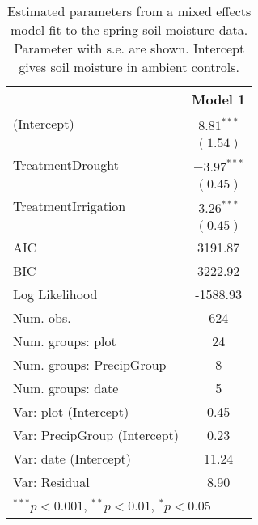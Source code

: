 
\begin{table}
\caption{Estimated parameters from a mixed effects model fit to the spring soil moisture data. Parameter with s.e. are shown. Intercept gives soil moisture in ambient controls.}
\begin{center}
\begin{tabular}{l c }
\hline
 & Model 1 \\
\hline
(Intercept)                  & $8.81^{***}$  \\
                             & $(1.54)$      \\
TreatmentDrought             & $-3.97^{***}$ \\
                             & $(0.45)$      \\
TreatmentIrrigation          & $3.26^{***}$  \\
                             & $(0.45)$      \\
\hline
AIC                          & 3191.87       \\
BIC                          & 3222.92       \\
Log Likelihood               & -1588.93      \\
Num. obs.                    & 624           \\
Num. groups: plot            & 24            \\
Num. groups: PrecipGroup     & 8             \\
Num. groups: date            & 5             \\
Var: plot (Intercept)        & 0.45          \\
Var: PrecipGroup (Intercept) & 0.23          \\
Var: date (Intercept)        & 11.24         \\
Var: Residual                & 8.90          \\
\hline
\multicolumn{2}{l}{\scriptsize{$^{***}p<0.001$, $^{**}p<0.01$, $^*p<0.05$}}
\end{tabular}
\label{table:spotVWC}
\end{center}
\end{table}

